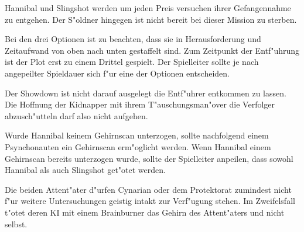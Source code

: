 Hannibal und Slingshot werden um jeden Preis versuchen ihrer Gefangennahme zu entgehen. Der S"oldner hingegen ist nicht bereit bei dieser Mission zu sterben.

\begin{remarks}
	Bei den drei Optionen ist zu beachten, dass sie in Herausforderung und Zeitaufwand von oben nach unten gestaffelt sind. Zum Zeitpunkt der Entf"uhrung ist der Plot erst zu einem Drittel gespielt. Der Spielleiter sollte je nach angepeilter Spieldauer sich f"ur eine der Optionen entscheiden.

	Der Showdown ist nicht darauf ausgelegt die Entf"uhrer entkommen zu lassen. Die Hoffnung der Kidnapper mit ihrem T"auschungsman"over
	die Verfolger abzusch"utteln darf also nicht aufgehen. 

	Wurde Hannibal keinem Gehirnscan unterzogen, sollte nachfolgend einem Psynchonauten ein Gehirnscan erm"oglicht werden. 
	Wenn Hannibal einem Gehirnscan bereits unterzogen wurde, sollte der Spielleiter anpeilen, dass sowohl Hannibal als auch Slingshot get"otet werden. 
	
	Die beiden Attent"ater d"urfen Cynarian oder dem Protektorat zumindest nicht f"ur weitere Untersuchungen
	geistig intakt zur Verf"ugung stehen. Im Zweifelsfall t"otet deren KI mit einem Brainburner das Gehirn des Attent"aters und nicht selbst.
\end{remarks}

